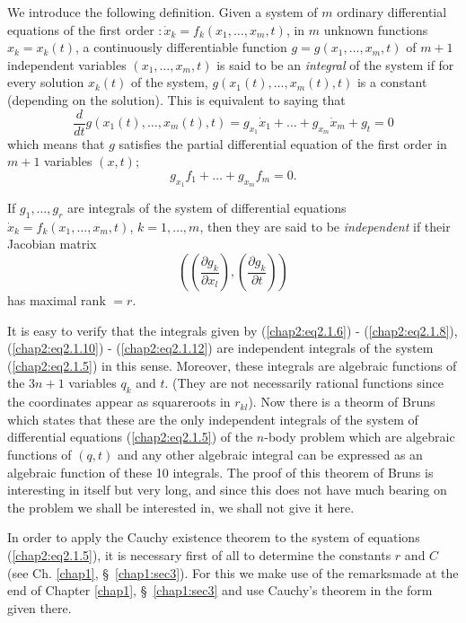 We introduce the following definition. Given a system of $m$ ordinary differential equations of the first order $: \dot{x}_k = f_k (x_1, \ldots, x_m, t)$, in $m$ unknown functions $x_k = x_k(t)$, a continuously differentiable function $g = g(x_1, \ldots, x_m,t)$ of $m+1$ independent variables $(x_1, \ldots, x_m,t)$ is said to be an {\em integral} of the system if for every solution $x_k(t)$ of the system, $g(x_1(t), \ldots, x_m(t),t)$ is a constant (depending on the solution). This is equivalent to saying that
$$
\frac{d}{dt} g(x_1(t), \ldots, x_m(t),t) = g_{x_1} \dot{x}_1+ \ldots + g_{x_m} \dot{x}_m + g_t = 0
$$
which means that $g$ satisfies the partial differential equation of the first order in $m+1$ variables $(x,t)$;
$$
g_{x_1} f_1 + \ldots + g_{x_m} f_m = 0.
$$\pageoriginale

If $g_1 , \ldots, g_r$ are integrals of the system of differential equations $\dot{x}_k = f_k (x_1, \ldots, x_m,t)$, $k =1 , \ldots, m$, then they are said to be {\em independent} if their Jacobian matrix
$$
\left( \left(\frac{\partial g_k}{\partial x_l} \right), \left(\frac{\partial g_k}{\partial t} \right) \right) 
$$
has maximal rank $= r$.

It is easy to verify that the integrals given by (\ref{chap2:eq2.1.6}) - (\ref{chap2:eq2.1.8}), (\ref{chap2:eq2.1.10}) - (\ref{chap2:eq2.1.12}) are independent integrals of the system (\ref{chap2:eq2.1.5}) in this sense. Moreover, these integrals are algebraic functions of the $3n+1$ variables $q_k$ and $t$. (They are not necessarily rational functions since the coordinates appear as squareroots in $r_{kl}$). Now there is a theorm of Bruns which states that these are the only independent integrals of the system of differential equations (\ref{chap2:eq2.1.5}) of the $n$-body problem which are algebraic functions of $(q,t)$ and any other algebraic integral can be expressed as an algebraic function of these 10 integrals. The proof of this theorem of Bruns is interesting in itself but very long, and since this does not have much bearing on the problem we shall be interested in, we shall not give it here.

In order to apply the Cauchy existence theorem to the system of equations (\ref{chap2:eq2.1.5}), it is necessary first of all to determine the constants $r$ and $C$ (see Ch. \ref{chap1}, \S\ \ref{chap1:sec3}). For this we make use of the remarks\pageoriginale made at the end of Chapter \ref{chap1}, \S\ \ref{chap1:sec3} and use Cauchy's theorem in the form given there.

